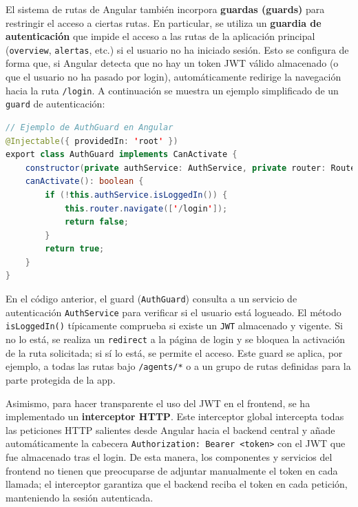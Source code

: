 \documentclass[11pt,a4paper,twoside]{report}
\begin{document}
El sistema de rutas de Angular también incorpora \textbf{guardas (guards)} para restringir el acceso a ciertas rutas. En particular, se utiliza un \textbf{guardia de autenticación} que impide el acceso a las rutas de la aplicación principal (\texttt{overview}, \texttt{alertas}, etc.) si el usuario no ha iniciado sesión. Esto se configura de forma que, si Angular detecta que no hay un token JWT válido almacenado (o que el usuario no ha pasado por login), automáticamente redirige la navegación hacia la ruta \texttt{/login}. A continuación se muestra un ejemplo simplificado de un \texttt{guard} de autenticación:

\pagebreak

\begin{lstlisting}[language=Java, caption={Ejemplo simplificado de authGuard}, label={lst:authGuard}]
// Ejemplo de AuthGuard en Angular
@Injectable({ providedIn: 'root' })
export class AuthGuard implements CanActivate {
	constructor(private authService: AuthService, private router: Router) {}
	canActivate(): boolean {
		if (!this.authService.isLoggedIn()) {
			this.router.navigate(['/login']);
			return false;
		}
		return true;
	}
}

\end{lstlisting}

En el código anterior, el guard (\texttt{AuthGuard}) consulta a un servicio de autenticación \texttt{AuthService} para verificar si el usuario está logueado. El método \texttt{isLoggedIn()} típicamente comprueba si existe un \texttt{JWT} almacenado y vigente. Si no lo está, se realiza un \texttt{redirect} a la página de login y se bloquea la activación de la ruta solicitada; si sí lo está, se permite el acceso. Este guard se aplica, por ejemplo, a todas las rutas bajo \texttt{/agents/*} o a un grupo de rutas definidas para la parte protegida de la app.\newline

Asimismo, para hacer transparente el uso del JWT en el frontend, se ha implementado un \textbf{interceptor HTTP}. Este interceptor global intercepta todas las peticiones HTTP salientes desde Angular hacia el backend central y añade automáticamente la cabecera \texttt{Authorization: Bearer <token>} con el JWT que fue almacenado tras el login. De esta manera, los componentes y servicios del frontend no tienen que preocuparse de adjuntar manualmente el token en cada llamada; el interceptor garantiza que el backend reciba el token en cada petición, manteniendo la sesión autenticada.\newline
\end{document}
